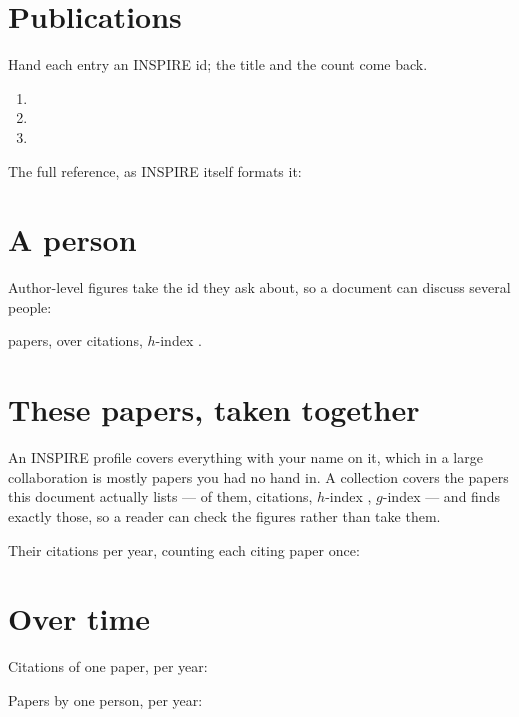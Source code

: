 \documentclass[11pt]{article}
\begin{document}
\section*{Publications}

Hand each entry an INSPIRE id; the title and the count come back.

\begin{enumerate}\itemsep0.5em
  \item {}
  \item {}
  \item {}
\end{enumerate}

The full reference, as INSPIRE itself formats it:


\section*{A person}

Author-level figures take the id they ask about, so a document can discuss
several people:

 papers, over
 citations, $h$-index
.

\section*{These papers, taken together}

An INSPIRE profile covers everything with your name on it, which in a large
collaboration is mostly papers you had no hand in. A collection covers the
papers this document actually lists --- \inspirecollectionpapers{} of them,
\inspirecollectioncitations{} citations, $h$-index \inspirecollectionhindex{},
$g$-index \inspirecollectiongindex{} --- and 
finds exactly those, so a reader can check the figures rather than take them.

Their citations per year, counting each citing paper once:

\inspirecollectionplot

\section*{Over time}

Citations of one paper, per year:


Papers by one person, per year:

\end{document}
